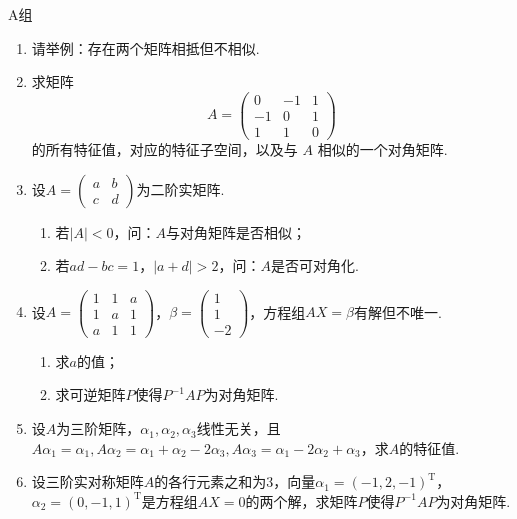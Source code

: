 \centerline{\heiti A组}
\begin{enumerate}
    \item 请举例：存在两个矩阵相抵但不相似.

    \item 求矩阵
          \[A=\left(\begin{array}{ccc}
                      0  & -1 & 1 \\
                      -1 & 0  & 1 \\
                      1  & 1  & 0
                  \end{array}\right)\]
          的所有特征值，对应的特征子空间，以及与 $A$ 相似的一个对角矩阵.

    \item 设$A=\begin{pmatrix}
                  a & b \\ c & d
              \end{pmatrix}$为二阶实矩阵.
          \begin{enumerate}
              \item 若$|A|<0$，问：$A$与对角矩阵是否相似；

              \item 若$ad-bc=1$，$|a+d|>2$，问：$A$是否可对角化.
          \end{enumerate}

    \item 设$A=\begin{pmatrix}
                  1 & 1 & a \\ 1 & a & 1 \\ a & 1 & 1
              \end{pmatrix}$，$\beta=\begin{pmatrix}
                  1 \\ 1 \\ -2
              \end{pmatrix}$，方程组$AX=\beta$有解但不唯一.
          \begin{enumerate}
              \item 求$a$的值；

              \item 求可逆矩阵$P$使得$P^{-1}AP$为对角矩阵.
          \end{enumerate}

    \item 设$A$为三阶矩阵，$\alpha_1,\alpha_2,\alpha_3$线性无关，且$A\alpha_1=\alpha_1,A\alpha_2=\alpha_1+\alpha_2-2\alpha_3,A\alpha_3=\alpha_1-2\alpha_2+\alpha_3$，求$A$的特征值.

    \item 设三阶实对称矩阵$A$的各行元素之和为3，向量$\alpha_1=(-1,2,-1)^\mathrm{T}$，$\alpha_2=(0,-1,1)^\mathrm{T}$是方程组$AX=0$的两个解，求矩阵$P$使得$P^{-1}AP$为对角矩阵.
\end{enumerate}

